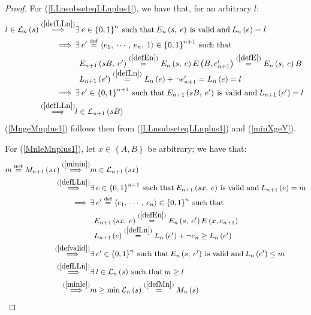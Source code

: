 \documentclass[a4paper,9pt,leqno]{article}
\renewcommand{\=}{\protect\nobreakdash-\hspace{0pt}}
\renewcommand{\~}{\protect\nobreakdash--\hspace{0pt}}
\newcommand{\textpar}{%
    \par\noindent\newline}
\theoremstyle{plain}
\theoremstyle{definition}
\theoremstyle{remark}
\newcommand{\impll}{\:\:\Longrightarrow\:\:}
\newcommand{\impl}{\impll}%
\newcommand{\parref}[1]{(\ref{#1})}
\newcommand{\by}[1]{{#1}}
\newcommand{\bydef}{\by{def}}
\newcommand{\bynot}{\by{not}}
\newcommand{\symby}[2]{\stackrel{#1}{{#2}}}
\newcommand{\symbyrm}[2]{\symby{{\rm\scriptstyle{#1}}}{#2}}
\newcommand{\implby}[1]{\symbyrm{#1}{\impll}}
\newcommand{\implbyref}[1]{\implby{\parref{#1}}}
\newcommand{\eqby}[1]{\symbyrm{#1}{=}}
\newcommand{\eqbydef}{\eqby{\bydef}}
\newcommand{\eqbyref}[1]{\eqby{\parref{#1}}}
\newcommand{\eqbynot}{\eqby{\bynot}}
\newcommand{\txt}[1]{\:\text{#1}\:}
\newcommand{\mc}{,\:}
\newcommand{\ms}{\:}
\newcommand{\lp}{\left(}
\newcommand{\lc}{\left\{}
\newcommand{\rp}{\right)}
\newcommand{\rc}{\right\}}
\newcommand{\la}{\left\langle}
\newcommand{\ra}{\right\rangle}
\begin{document}
\begin{proof}
For \parref{LLnsubseteqLLnplus1}, we have that, for an arbitrary $l$:
%
\begin{align*}
l \in \mathcal{L}_n \lp s \rp 
\implbyref{defLLn} & \exists\ms e \in \lc 0, 1 \rc^n \txt{such that}
    E_n \lp s\mc e \rp \txt{is valid and} L_n \lp e \rp = l \\
\impl & \exists\ms e'\eqbydef \la e_1\mc\cdots\mc e_n\mc 1\ra \in \lc 0, 1 \rc^{n+1} \txt{such that} \\
& \begin{array}{l}
    E_{n+1} \lp s B\mc e' \rp
      \eqbyref{defEn} E_n \lp s\mc e \rp E\lp B, e'_{n+1} \rp
      \eqbyref{defE} E_n \lp s\mc e \rp B \\
    L_{n+1} \lp e' \rp \eqbyref{defLn} L_n \lp e \rp + \neg e'_{n+1} = L_n \lp e\rp = l
  \end{array} \\
\impl & \exists\ms e'\in \lc 0, 1 \rc^{n+1} \txt{such that}
  E_{n+1} \lp s B\mc e' \rp \txt{is valid and}
  L_{n+1} \lp e' \rp = l \\
\implbyref{defLLn} & l \in \mathcal{L}_{n+1} \lp s B \rp
\end{align*}
%
\parref{MngeMnplus1} follows then from \parref{LLnsubseteqLLnplus1} and
\parref{minXgeY}.
\textpar
For \parref{MnleMnplus1}, let $x\in\lc A, B\rc$ be arbitrary; we have that:
%
\begin{align*}
m \eqbynot M_{n+1} \lp s x \rp 
\implbyref{minin} & m \in \mathcal{L}_{n+1} \lp s x \rp \\
\implbyref{defLLn} & \exists\ms e \in \lc 0, 1 \rc^{n+1} \txt{such that}
    E_{n+1} \lp s x\mc e \rp \txt{is valid and} L_{n+1} \lp e \rp = m \\
\impl & \exists\ms e'\eqbydef \la e_1\mc\cdots\mc e_n\ra \in \lc 0, 1 \rc^n \txt{such that} \\
& \begin{array}{l}
    E_{n+1} \lp s x\mc e \rp
      \eqbyref{defEn} E_n \lp s\mc e' \rp E\lp x, e_{n+1} \rp \\
    L_{n+1} \lp e \rp \eqbyref{defLn} L_n \lp e' \rp + \neg e_n \ge L_n \lp e'\rp
  \end{array} \\
\implbyref{defvalid} & \exists\ms e'\in \lc 0, 1 \rc^n \txt{such that}
  E_n \lp s\mc e' \rp \txt{is valid and}
  L_n \lp e' \rp \le m \\
\implbyref{defLLn} & \exists\ms l\in \mathcal{L}_n \lp s \rp
  \txt{such that} m \ge l \\
\implbyref{minle} & m \ge \min\mathcal{L}_n \lp s \rp
  \eqbyref{defMn} M_n \lp s \rp
\end{align*}
%
\end{proof}
\end{document}
